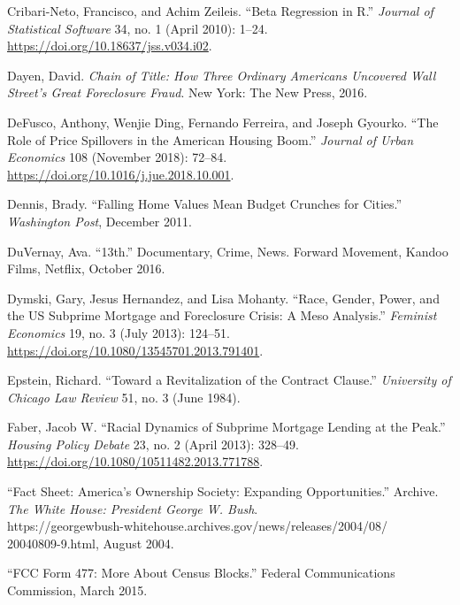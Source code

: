\documentclass[12pt,oneside]{psthesis}
\begin{document}
\leavevmode\hypertarget{ref-cribarineto2010beta}{}%
Cribari-Neto, Francisco, and Achim Zeileis. ``Beta Regression in R.'' \emph{Journal of Statistical Software} 34, no. 1 (April 2010): 1--24. \url{https://doi.org/10.18637/jss.v034.i02}.

\leavevmode\hypertarget{ref-dayenChainTitleHow2016}{}%
Dayen, David. \emph{Chain of Title: How Three Ordinary Americans Uncovered Wall Street's Great Foreclosure Fraud}. New York: The New Press, 2016.

\leavevmode\hypertarget{ref-defusco2018role}{}%
DeFusco, Anthony, Wenjie Ding, Fernando Ferreira, and Joseph Gyourko. ``The Role of Price Spillovers in the American Housing Boom.'' \emph{Journal of Urban Economics} 108 (November 2018): 72--84. \url{https://doi.org/10.1016/j.jue.2018.10.001}.

\leavevmode\hypertarget{ref-dennis2011falling}{}%
Dennis, Brady. ``Falling Home Values Mean Budget Crunches for Cities.'' \emph{Washington Post}, December 2011.

\leavevmode\hypertarget{ref-duvernay201613th}{}%
DuVernay, Ava. ``13th.'' Documentary, Crime, News. Forward Movement, Kandoo Films, Netflix, October 2016.

\leavevmode\hypertarget{ref-dymski2013race}{}%
Dymski, Gary, Jesus Hernandez, and Lisa Mohanty. ``Race, Gender, Power, and the US Subprime Mortgage and Foreclosure Crisis: A Meso Analysis.'' \emph{Feminist Economics} 19, no. 3 (July 2013): 124--51. \url{https://doi.org/10.1080/13545701.2013.791401}.

\leavevmode\hypertarget{ref-epstein1984revitalization}{}%
Epstein, Richard. ``Toward a Revitalization of the Contract Clause.'' \emph{University of Chicago Law Review} 51, no. 3 (June 1984).

\leavevmode\hypertarget{ref-faber2013racial}{}%
Faber, Jacob W. ``Racial Dynamics of Subprime Mortgage Lending at the Peak.'' \emph{Housing Policy Debate} 23, no. 2 (April 2013): 328--49. \url{https://doi.org/10.1080/10511482.2013.771788}.

\leavevmode\hypertarget{ref-2004fact}{}%
``Fact Sheet: America's Ownership Society: Expanding Opportunities.'' Archive. \emph{The White House: President George W. Bush}. \\ https://georgewbush-whitehouse.archives.gov/news/releases/2004/08/\\20040809-9.html, August 2004.

\leavevmode\hypertarget{ref-2015fcc}{}%
``FCC Form 477: More About Census Blocks.'' Federal Communications Commission, March 2015.
\end{document}
